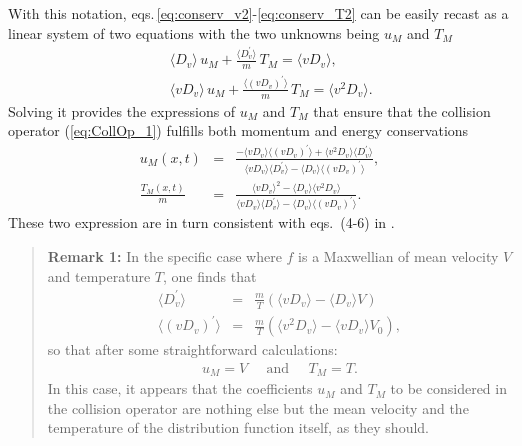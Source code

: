 \documentclass[11pt]{article}
\begin{document}
%
With this notation, eqs.\,\eqref{eq:conserv_v2}-\eqref{eq:conserv_T2} can be easily recast as a linear system of two equations with the two unknowns being $u_M$ and $T_M$
%
\begin{eqnarray}
&&  \langle D_v \rangle\, u_M + \frac{\langle D_v^\prime \rangle}{m}\, T_M 
= \langle v D_v \rangle  \label{eq:conserv_v3}, \\
&&  \langle v D_v \rangle\, u_M + 
\frac{\langle (v D_v)^\prime \rangle}{m}\, T_M 
= \langle v^2 D_v \rangle.\label{eq:conserv_T3}
\end{eqnarray}
Solving it provides the expressions of $u_M$ and $T_M$ that ensure that the collision operator (\ref{eq:CollOp_1}) fulfills both momentum and energy conservations
%
\begin{eqnarray}
u_M(x,t) &=& 
\frac{-\langle vD_v \rangle\langle (v D_v)^\prime \rangle+\langle v^2D_v \rangle\langle D_v^\prime \rangle}
{\langle vD_v \rangle\langle D_v^\prime \rangle-\langle D_v \rangle\langle (v D_v)^\prime \rangle},  \label{eq:def_VM} \\
\frac{T_M(x,t)}{m} &=&
\frac{\langle vD_v \rangle^2 - \langle D_v \rangle\langle v^2D_v \rangle}
{\langle vD_v \rangle\langle D_v^\prime \rangle-\langle D_v \rangle\langle (v D_v)^\prime \rangle}. \label{eq:def_TM}
\end{eqnarray} 
%
These two expression are in turn consistent with eqs.\ (4-6) in \cite{DifPradalier2011}.

\begin{footnotesize}
\begin{quotation}
	\textbf{Remark 1:} In the specific case where $f$ is a Maxwellian of mean velocity $V$ and temperature $T$, one finds that
	\begin{eqnarray*}
	\langle D_v^\prime \rangle &=& \frac{m}{T}\left( 
	  \langle vD_v \rangle - \langle D_v \rangle V\right) \\
	\langle (vD_v)^\prime \rangle &=& \frac{m}{T}\left( 
    	\langle v^2D_v \rangle - \langle vD_v \rangle V_0\right),
	\end{eqnarray*}
	so that after some straightforward calculations:
	\begin{eqnarray*}
		u_M = V \;\;\;\;\; \textrm{and} \;\;\;\;\; T_M = T.
	\end{eqnarray*}
	In this case, it appears that the coefficients $u_M$ and $T_M$ to be considered in the collision operator are nothing else but the mean velocity and the temperature of the distribution function itself, as they should.
\end{quotation}
\end{footnotesize}
\end{document}
